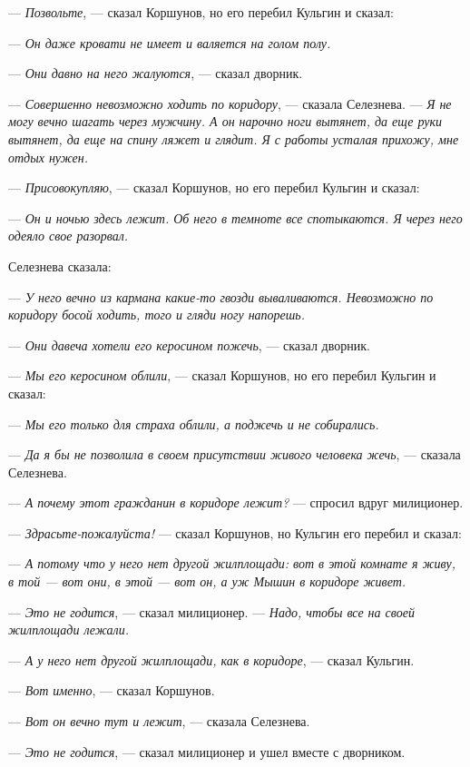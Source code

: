 --- \textit{Позвольте}, --- сказал Коршунов, но его перебил Кульгин и сказал:

--- \textit{Он даже кровати не имеет и валяется на голом полу.}

--- \textit{Они давно на него жалуются}, --- сказал дворник.

--- \textit{Совершенно невозможно ходить по коридору}, --- сказала Селезнева. --- \textit{Я не могу вечно шагать через мужчину. А он нарочно ноги вытянет, да еще руки вытянет, да еще на спину ляжет и глядит. Я с работы усталая прихожу, мне отдых нужен.}

--- \textit{Присовокупляю}, --- сказал Коршунов, но его перебил Кульгин и сказал:

--- \textit{Он и ночью здесь лежит. Об него в темноте все спотыкаются. Я через него одеяло свое разорвал.}

Селезнева сказала:

--- \textit{У него вечно из кармана какие-то гвозди вываливаются. Невозможно по коридору босой ходить, того и гляди ногу напорешь.}

--- \textit{Они давеча хотели его керосином пожечь}, --- сказал дворник.

--- \textit{Мы его керосином облили}, --- сказал Коршунов, но его перебил Кульгин и сказал:

--- \textit{Мы его только для страха облили, а поджечь и не собирались.}

--- \textit{Да я бы не позволила в своем присутствии живого человека жечь}, --- сказала Селезнева.

--- \textit{А почему этот гражданин в коридоре лежит?} --- спросил вдруг милиционер.

--- \textit{Здрасьте-пожалуйста!} --- сказал Коршунов, но Кульгин его перебил и сказал:

--- \textit{А потому что у него нет другой жилплощади: вот в этой комнате я живу, в той --- вот они, в этой --- вот он, а уж Мышин в коридоре живет.}

--- \textit{Это не годится}, --- сказал милиционер. --- \textit{Надо, чтобы все на своей жилплощади лежали.}

--- \textit{А у него нет другой жилплощади, как в коридоре}, --- сказал Кульгин.

--- \textit{Вот именно}, --- сказал Коршунов.

--- \textit{Вот он вечно тут и лежит}, --- сказала Селезнева.

--- \textit{Это не годится}, --- сказал милиционер и ушел вместе с дворником.

